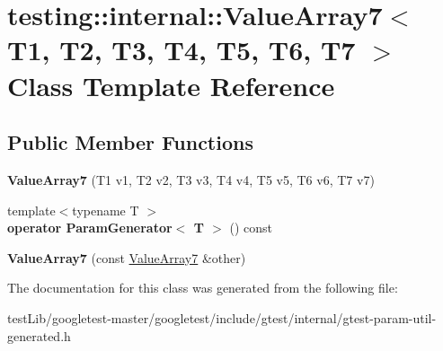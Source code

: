 \hypertarget{classtesting_1_1internal_1_1ValueArray7}{}\section{testing\+:\+:internal\+:\+:Value\+Array7$<$ T1, T2, T3, T4, T5, T6, T7 $>$ Class Template Reference}
\label{classtesting_1_1internal_1_1ValueArray7}
\subsection*{Public Member Functions}
\begin{DoxyCompactItemize}
\item 
\mbox{\label{classtesting_1_1internal_1_1ValueArray7_a34570dbbcc50d20f94e4a0c693e42f09}} 
{\bfseries Value\+Array7} (T1 v1, T2 v2, T3 v3, T4 v4, T5 v5, T6 v6, T7 v7)
\item 
\mbox{\label{classtesting_1_1internal_1_1ValueArray7_a4ab41f4a5687896e159c69f581d0a673}} 
{\footnotesize template$<$typename T $>$ }\\{\bfseries operator Param\+Generator$<$ T $>$} () const
\item 
\mbox{\label{classtesting_1_1internal_1_1ValueArray7_ab4be0da0f772c885c6fe681ea486ece4}} 
{\bfseries Value\+Array7} (const \hyperlink{classtesting_1_1internal_1_1ValueArray7}{Value\+Array7} \&other)
\end{DoxyCompactItemize}


The documentation for this class was generated from the following file\+:\begin{DoxyCompactItemize}
\item 
test\+Lib/googletest-\/master/googletest/include/gtest/internal/gtest-\/param-\/util-\/generated.\+h\end{DoxyCompactItemize}
